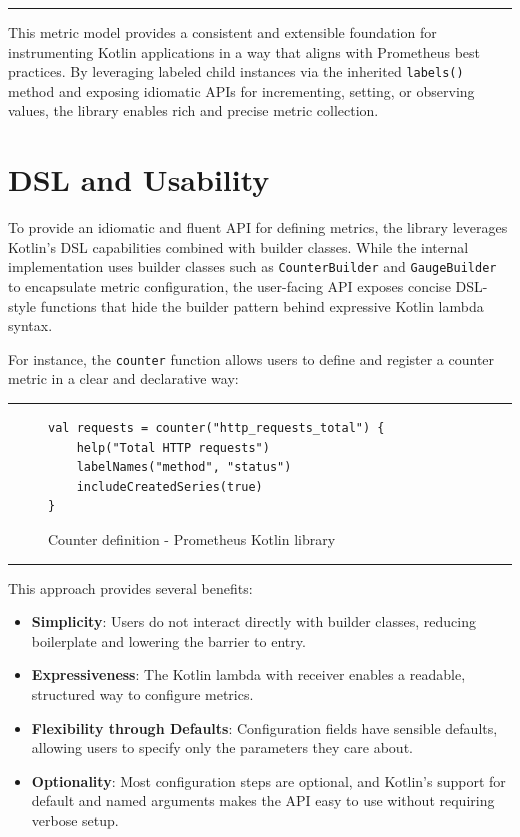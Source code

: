 \noindent\rule{\linewidth}{0.4pt}


This metric model provides a consistent and extensible foundation for instrumenting Kotlin applications in a way that aligns with Prometheus best practices.
By leveraging labeled child instances via the inherited \texttt{labels()} method and exposing idiomatic APIs for incrementing, setting, or observing values, the library enables rich and precise metric collection.

\section{DSL and Usability}\label{sec:dsl-and-usability}

To provide an idiomatic and fluent \ac{API} for defining metrics, the library leverages Kotlin’s \ac{DSL} capabilities
combined with builder classes.
While the internal implementation uses builder classes such as \texttt{CounterBuilder} and \texttt{GaugeBuilder} to
encapsulate metric configuration, the user-facing \ac{API} exposes concise \ac{DSL}-style functions that hide the
builder pattern behind expressive Kotlin lambda syntax.

For instance, the \texttt{counter} function allows users to define and register a counter metric in a clear and declarative way:

\noindent\rule{\linewidth}{0.4pt}

\begin{figure}[h]
    \begin{lstlisting}
val requests = counter("http_requests_total") {
    help("Total HTTP requests")
    labelNames("method", "status")
    includeCreatedSeries(true)
}
    \end{lstlisting}
    \caption{Counter definition - Prometheus Kotlin library}
\end{figure}

\noindent\rule{\linewidth}{0.4pt}

This approach provides several benefits:

\begin{itemize}
    \item \textbf{Simplicity}: Users do not interact directly with builder classes, reducing boilerplate and lowering the barrier to entry.
    \item \textbf{Expressiveness}: The Kotlin lambda with receiver enables a readable, structured way to configure metrics.
    \item \textbf{Flexibility through Defaults}: Configuration fields have sensible defaults, allowing users to specify only the parameters they care about.
    \item \textbf{Optionality}: Most configuration steps are optional, and Kotlin’s support for default and named
    arguments makes the \ac{API} easy to use without requiring verbose setup.
\end{itemize}

